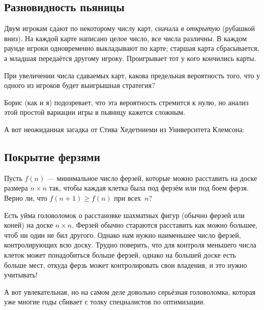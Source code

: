 \subsection*{Разновидность пьяницы}

Двум игрокам сдают по некоторому числу карт, сначала \emph{в открытую} (рубашкой вниз).
На каждой карте написано целое число, все числа различны.
В каждом раунде игроки одновременно выкладывают по карте;
старшая карта сбрасывается, а младшая передаётся другому игроку.
Проигрывает тот у кого кончились карты.

При увеличении числа сдаваемых карт,
какова предельная вероятность того, что у одного из игроков будет выигрышная стратегия?

\medskip

Борис (как и я) подозревает, что эта вероятность стремится к нулю, но анализ этой простой вариации игры в пьяницу кажется сложным.


\medskip

А вот неожиданная загадка от Стива Хедетниеми из Университета Клемсона:

\subsection*{Покрытие ферзями}

Пусть $f(n)$ --- минимальное число ферзей, которые можно расставить на доске размера $n \times n$ так, чтобы каждая клетка была под ферзём или под боем ферзя.
Верно ли, что $f(n + 1) \geqslant f(n)$ при всех~$n$?

\medskip

Есть уйма головоломок о расстановке шахматных фигур (обычно ферзей или коней) на доске $n \times n$.
Ферзей обычно стараются расставить как можно большее, чтоб ни один не бил другого.
Однако нам нужно наименьшее число ферзей, контролирующих всю доску.
Трудно поверить, что для контроля меньшего числа клеток может понадобиться больше ферзей, однако на большей доске есть больше мест, откуда ферзь может контролировать свои владения, и это нужно учитывать!

\medskip

А вот увлекательная, но на самом деле довольно серьёзная головоломка, которая уже многие годы сбивает с толку специалистов по оптимизации.

